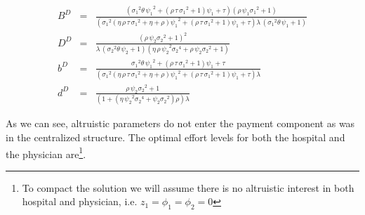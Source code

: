 \documentclass[12pt,letterpaper]{article}
\begin{document}
\begin{eqnarray*}
  B^D &=& {\frac { \left( {\sigma_{{1}}}^{2}\theta\,{\psi_{{1}}}^{2}+ \left(
\rho\,\tau\,{\sigma_{{1}}}^{2}+1 \right) \psi_{{1}}+\tau \right)
 \left( \rho\,\psi_{{1}}{\sigma_{{1}}}^{2}+1 \right) }{ \left( {\sigma
_{{1}}}^{2} \left( \eta\,\rho\,\tau\,{\sigma_{{1}}}^{2}+\eta+\rho
 \right) {\psi_{{1}}}^{2}+ \left( \rho\,\tau\,{\sigma_{{1}}}^{2}+1
 \right) \psi_{{1}}+\tau \right) \lambda\, \left( {\sigma_{{1}}}^{2}
\theta\,\psi_{{1}}+1 \right) }} \\
  D ^D&=& {\frac { \left( \rho\,\psi_{{2}}{\sigma_{{2}}}^{2}+1 \right) ^{2}}{
\lambda\, \left( {\sigma_{{2}}}^{2}\theta\,\psi_{{2}}+1 \right)
 \left( \eta\,\rho\,{\psi_{{2}}}^{2}{\sigma_{{2}}}^{4}+\rho\,\psi_{{2}
}{\sigma_{{2}}}^{2}+1 \right) }}\\
  b^D &=& {\frac {{\sigma_{{1}}}^{2}\theta\,{\psi_{{1}}}^{2}+ \left( \rho\,\tau
\,{\sigma_{{1}}}^{2}+1 \right) \psi_{{1}}+\tau}{ \left( {\sigma_{{1}}}
^{2} \left( \eta\,\rho\,\tau\,{\sigma_{{1}}}^{2}+\eta+\rho \right) {
\psi_{{1}}}^{2}+ \left( \rho\,\tau\,{\sigma_{{1}}}^{2}+1 \right) \psi_
{{1}}+\tau \right) \lambda}}\\
  d^D &=& {\frac {\rho\,\psi_{{2}}{\sigma_{{2}}}^{2}+1}{ \left( 1+ \left( \eta
\,{\psi_{{2}}}^{2}{\sigma_{{2}}}^{4}+\psi_{{2}}{\sigma_{{2}}}^{2}
 \right) \rho \right) \lambda}}
\end{eqnarray*}

As we can see, altruistic parameters do not enter the payment component as was in the centralized structure. The optimal effort levels for both the hospital and the physician are\footnote{To compact the solution we  will assume there is no altruistic interest in both hospital and physician, i.e. $z_1=\phi_1=\phi_2=0$}.
\end{document}
